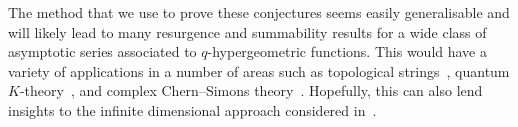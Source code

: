 \documentclass[12pt,reqno]{amsart}
\theoremstyle{definition}
\renewcommand{\=}{\;=\;}
\begin{document}


The method that we use to prove these conjectures seems easily generalisable and will likely lead to many resurgence and summability results for a wide class of asymptotic series associated to $q$-hypergeometric functions. This would have a variety of applications in a number of areas such as topological strings~\cite{GM:tsres}, quantum $K$-theory~\cite{GivLee:QK}, and complex Chern--Simons theory~\cite{GGM:I}. Hopefully, this can also lend insights to the infinite dimensional approach considered in~\cite{KS:floer}.
\end{document}

